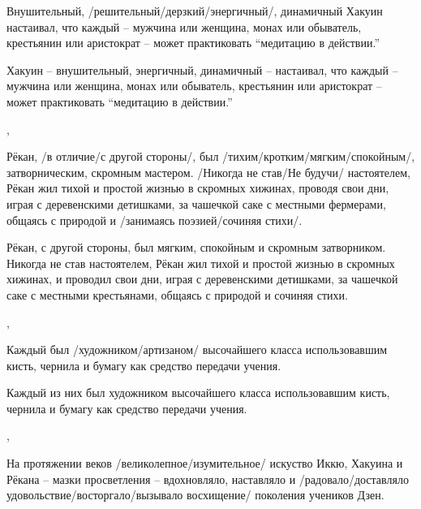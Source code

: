 \begin{ver}
Внушительный, /решительный/дерзкий/энергичный/,
динамичный Хакуин  настаивал, что каждый
-- мужчина или женщина, монах или обыватель, крестьянин или аристократ
-- может практиковать ``медитацию в действии.''
\end{ver}

\begin{ver}[1]
Хакуин -- внушительный, энергичный, динамичный -- настаивал, что каждый
-- мужчина или женщина, монах или обыватель, крестьянин или аристократ
-- может практиковать ``медитацию в действии.''
\end{ver}
\sep

\begin{ver}
Рёкан, /в отличие/с другой стороны/, был
/тихим/кротким/мягким/спокойным/, затворническим, скромным
мастером. /Никогда не став/Не будучи/ настоятелем, Рёкан жил тихой и
простой жизнью в скромных хижинах, проводя свои дни, играя с
деревенскими детишками, за чашечкой саке с местными фермерами, общаясь
с природой и /занимаясь поэзией/сочиняя стихи/.
\end{ver}

\begin{ver}[1]
Рёкан, с другой стороны, был мягким, спокойным и скромным
затворником. Никогда не став настоятелем, Рёкан жил тихой и простой
жизнью в скромных хижинах, и проводил свои дни, играя с деревенскими
детишками, за чашечкой саке с местными крестьянами, общаясь с природой
и сочиняя стихи.
\end{ver}
\sep

\begin{ver}
Каждый был /художником/артизаном/ высочайшего класса
использовавшим кисть, чернила и бумагу как средство передачи
учения.
\end{ver}

\begin{ver}[1]
Каждый из них был художником высочайшего класса
использовавшим кисть, чернила и бумагу как средство передачи
учения.
\end{ver}
\sep

\begin{ver}
На протяжении веков /великолепное/изумительное/
искуство Иккю, Хакуина и Рёкана -- мазки просветления --
вдохновляло, наставляло и /радовало/доставляло
удовольствие/восторгало/вызывало восхищение/ поколения
учеников Дзен.
\end{ver}

